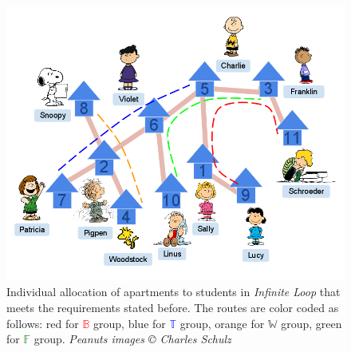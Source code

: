 \documentclass[MS,synopsis]{iitmdiss}
\def \figtabsize {\footnotesize}
\def \xLLL {\mathbb{B}}
\def \xGGG {\mathbb{T}}
\def \xBBB {\mathbb{W}}
\def \xTTT {\mathbb{F}}
\def \residenceblock {{\em Infinite Loop}}
\begin{document}
\begin{figure}[htbp] %
  \centering
  \includegraphics[scale=0.3]{../img/3_infinite_loop.png}
  \caption{\figtabsize Individual allocation of apartments to students
    in {\residenceblock} that meets the requirements stated before.
    The routes are color coded as follows: red for
    \textcolor{red}{$\xLLL$} group, blue for \textcolor{blue}{$\xGGG$}
    group, orange for \textcolor{YellowOrange}{$\xBBB$} group, green
    for \textcolor{green}{$\xTTT$} group. {\tiny {\em Peanuts images
        {\copyright} Charles Schulz}}}
  \label{fig:streetmappathpeople}
\end{figure}
\end{document}
